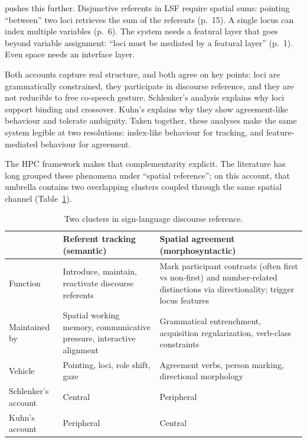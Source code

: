 \textcite{kuhn2022} pushes this further. Disjunctive referents in LSF require spatial sums: pointing \enquote{between} two loci retrieves the sum of the referents (p.~15). A single locus can index multiple variables (p.~6). The system needs a featural layer that goes beyond variable assignment: \enquote{loci must be mediated by a featural layer} (p.~1). Even space needs an interface layer.

Both accounts capture real structure, and both agree on key points: loci are grammatically constrained, they participate in discourse reference, and they are not reducible to free co-speech gesture. Schlenker's analysis explains why loci support binding and crossover. Kuhn's explains why they show agreement-like behaviour and tolerate ambiguity. Taken together, these analyses make the same system legible at two resolutions: index-like behaviour for tracking, and feature-mediated behaviour for agreement.

The HPC framework makes that complementarity explicit. The literature has long grouped these phenomena under \enquote{spatial reference}; on this account, that umbrella contains two overlapping clusters coupled through the same spatial channel (Table~\ref{tab:sign:two-clusters}).

\begin{table}[htbp]
\caption{Two clusters in sign-language discourse reference.}
\label{tab:sign:two-clusters}
\small
\centering
\begin{tabular}{@{}p{2.8cm}p{5.2cm}p{5.2cm}@{}}
\toprule
 & \textbf{Referent tracking} (semantic) & \textbf{Spatial agreement} (morphosyntactic) \\
\midrule
Function & Introduce, maintain, reactivate discourse referents & Mark participant contrasts (often first vs non-first) and number-related distinctions via directionality; trigger locus features \\
\addlinespace
Maintained by & Spatial working memory, communicative pressure, interactive alignment & Grammatical entrenchment, acquisition regularization, verb-class constraints \\
\addlinespace
Vehicle & Pointing, loci, role shift, gaze & Agreement verbs, person marking, directional morphology \\
\addlinespace
Schlenker's account & Central & Peripheral \\
\addlinespace
Kuhn's account & Peripheral & Central \\
\bottomrule
\end{tabular}
\end{table}

